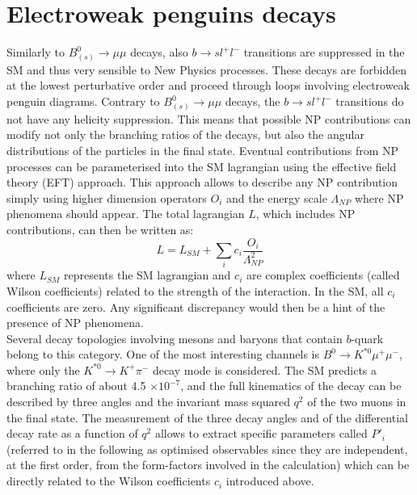\section{Electroweak penguins decays}
Similarly to $B^0_{(s)} \to \mu \mu$ decays, also $b \to s l^+ l^-$ transitions are suppressed in the SM and thus very sensible to New Physics processes. These decays are forbidden at the lowest perturbative order and proceed through loops involving electroweak penguin diagrams. Contrary to $B^0_{(s)} \to \mu \mu$ decays, the $b \to s l^+ l^-$ transitions do not have any helicity suppression. This means that possible NP contributions can modify not only the branching ratios of the decays, but also the angular distributions of the particles in the final state. Eventual contributions from NP processes can be parameterised into the SM lagrangian using the effective field theory (EFT) approach. This approach allows to describe any NP contribution simply using higher dimension operators $O_i$ and the energy scale $\Lambda_{NP}$ where NP phenomena should appear. The total lagrangian $L$, which includes NP contributions, can then be written as:
\begin{equation}
L = L_{SM}+\sum_i c_i \frac{O_i}{\Lambda^2_{NP}}
\label{eq:wilson}
\end{equation}
where $L_{SM}$ represents the SM lagrangian and $c_i$ are complex coefficients (called Wilson coefficients) related to the strength of the interaction. In the SM, all $c_i$ coefficients are zero. Any significant discrepancy would then be a hint of the presence of NP phenomena.\\
Several decay topologies involving mesons and baryons that contain $b$-quark belong to this category. One of the most interesting channels is $B^0 \to K^{*0} \mu^+ \mu^-$, where only the $K^{*0} \to K^+ \pi^-$ decay mode is considered. The SM predicts a branching ratio of about 4.5 $\times 10^{-7}$, and the full kinematics of the decay can be described by three angles and the invariant mass squared $q^2$ of the two muons in the final state. The measurement of the three decay angles and of the differential decay rate as a function of $q^2$ allows to extract specific parameters called $P'_i$ (referred to in the following as optimised observables since they are independent, at the first order, from the form-factors involved in the calculation) which can be directly related to the Wilson coefficients $c_i$ introduced above. \\
